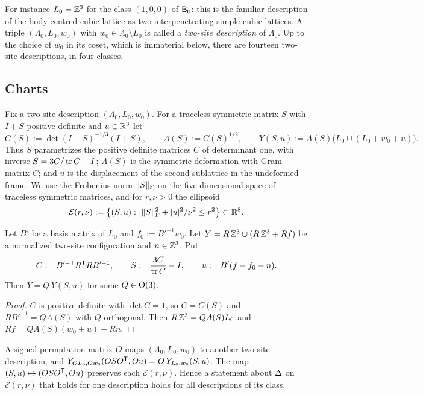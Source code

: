 For instance $L_0=\mathbb Z^3$ for the class $(1,0,0)$ of $\mathsf B_0$: this is the familiar description of the body-centred cubic lattice as two
interpenetrating simple cubic lattices. A triple $(\Lambda_0,L_0,w_0)$ with $w_0\in\Lambda_0\setminus L_0$ is called a
\emph{two-site description} of $\Lambda_0$. Up to the choice of $w_0$ in its coset, which is immaterial below, there are fourteen
two-site descriptions, in four classes.

\subsection{Charts}\label{ssec:charts}

Fix a two-site description $(\Lambda_0,L_0,w_0)$. For a traceless symmetric matrix $S$ with $I+S$ positive definite and $u\in\mathbb R^3$ let
\begin{equation}\label{eq:chart}
  C(S):=\det(I+S)^{-1/3}(I+S),\qquad A(S):=C(S)^{1/2},\qquad Y(S,u):=A(S)\bigl(L_0\cup(L_0+w_0+u)\bigr).
\end{equation}
Thus $S$ parametrizes the positive definite matrices $C$ of determinant one, with inverse $S=3C/\operatorname{tr} C-I$; $A(S)$ is the symmetric
deformation with Gram matrix $C$; and $u$ is the displacement of the second sublattice in the undeformed frame. We use the Frobenius
norm $\|S\|_\mathrm F$ on the five-dimensional space of traceless symmetric matrices, and for $r,\nu>0$ the ellipsoid
\[
  \mathcal E(r,\nu):=\bigl\{(S,u):\ \|S\|_\mathrm F^2+|u|^2/\nu^2\le r^2\bigr\}\subset\mathbb R^8 .
\]

\begin{lemma}\label{lem:membership}
Let $B'$ be a basis matrix of $L_0$ and $f_0:=B'^{-1}w_0$. Let $Y=R\,\mathbb Z^3\cup(R\,\mathbb Z^3+Rf)$ be a normalized two-site configuration and
$n\in\mathbb Z^3$. Put
\[
  C:=B'^{-\mathsf T}R^\mathsf T RB'^{-1},\qquad S:=\frac{3C}{\operatorname{tr} C}-I,\qquad u:=B'(f-f_0-n).
\]
Then $Y=Q\,Y(S,u)$ for some $Q\in\mathrm{O}(3)$.
\end{lemma}

\begin{proof}
$C$ is positive definite with $\det C=1$, so $C=C(S)$ and $RB'^{-1}=QA(S)$ with $Q$ orthogonal. Then $R\,\mathbb Z^3=QA(S)L_0$ and
$Rf=QA(S)(w_0+u)+Rn$.
\end{proof}

A signed permutation matrix $O$ maps $(\Lambda_0,L_0,w_0)$ to another two-site description, and
$Y_{OL_0,Ow_0}(OSO^\mathsf T,Ou)=O\,Y_{L_0,w_0}(S,u)$. The map $(S,u)\mapsto(OSO^\mathsf T,Ou)$ preserves each $\mathcal E(r,\nu)$. Hence a statement
about $\Delta$ on $\mathcal E(r,\nu)$ that holds for one description holds for all descriptions of its class.

